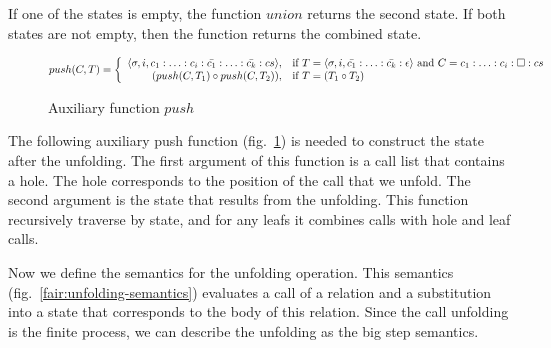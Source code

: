 
If one of the states is empty, the function $union$ returns the second state. If both states are not empty, then the function returns the combined state.

\begin{figure}[h!]
\[
push(C, T) =
\left\{
\begin{array}{rl}
\langle \sigma, i, c_1 : \ldots : c_i : \bar{c_1} : \ldots : \bar{c_k} : cs \rangle, & \mbox{if } T = \langle \sigma, i, \bar{c_1} : \ldots : \bar{c_k} : \epsilon \rangle \mbox{ and } C = c_1 : \ldots : c_i : \Box : cs \\
(push(C, T_1) \circ push(C, T_2)), & \mbox{if } T = (T_1 \circ T_2)
\end{array}
\right.
\]
\caption{Auxiliary function $push$}
\label{fair:push-semantics}
\end{figure}


The following auxiliary push function (fig.~\ref{fair:push-semantics}) is needed to construct the state after the unfolding. 
The first argument of this function is a call list that contains a hole. 
The hole corresponds to the position of the call that we unfold. 
The second argument is the state that results from the unfolding. 
This function recursively traverse by state, and for any leafs it combines calls with hole and leaf calls.

Now we define the semantics for the unfolding operation. This semantics (fig.~\ref{fair:unfolding-semantics}) evaluates a call of a relation and a substitution into a state that corresponds to the body of this relation. Since the call unfolding is the finite process, we can describe the unfolding as the big step semantics.

